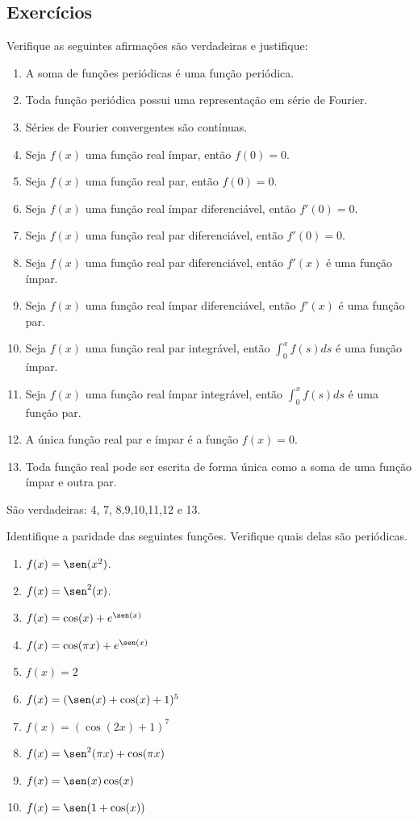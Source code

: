 \subsection*{Exercícios}
 \begin{exer}Verifique as seguintes afirmações são verdadeiras e justifique:
\begin{enumerate}
\item A soma de funções periódicas é uma função periódica.
\item Toda função periódica possui uma representação em série de Fourier.
\item Séries de Fourier convergentes são contínuas.
\item Seja $f(x)$ uma função real ímpar, então $f(0)=0$.
\item Seja $f(x)$ uma função real par, então $f(0)=0$.
\item Seja $f(x)$ uma função real ímpar diferenciável, então $f'(0)=0$.
\item Seja $f(x)$ uma função real par diferenciável, então $f'(0)=0$.
\item Seja $f(x)$ uma função real par diferenciável, então $f'(x)$ é uma função ímpar.
\item Seja $f(x)$ uma função real ímpar diferenciável, então $f'(x)$ é uma função par.
\item Seja $f(x)$ uma função real par integrável, então $\int_0^xf(s)ds$ é uma função ímpar.
\item Seja $f(x)$ uma função real ímpar integrável, então $\int_0^xf(s)ds$ é uma função par.
\item A única função real par e ímpar é a função $f(x)=0$.
\item Toda função real pode ser escrita de forma única como a soma de uma função ímpar e outra par.
\end{enumerate}
\end{exer}
\begin{resp} São verdadeiras: 4, 7, 8,9,10,11,12 e 13.
\end{resp}
\begin{exer}Identifique a paridade das seguintes funções. Verifique quais delas são periódicas.
\begin{enumerate}
\item $f(x)=\sen(x^2)$.
\item $f(x)=\sen^2(x)$.
\item $f(x)=\cos(x)+e^{\sen(x)}$
\item $f(x)=\cos(\pi x)+e^{\sen(x)}$
\item $f(x)=2$
\item $f(x)=(\sen(x)+\cos(x)+1)^5$
\item $f(x)=(\cos(2x)+1)^7$
\item $f(x)=\sen^2(\pi x)+\cos(\pi x)$
\item $f(x)=\sen(x)\cos(x)$
\item $f(x)=\sen(1+\cos(x))$
\end{enumerate}
\end{exer}
